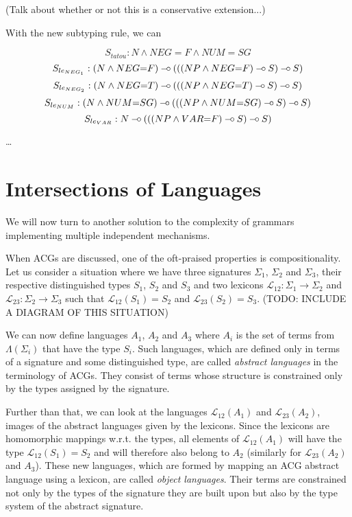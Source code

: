 (Talk about whether or not this is a conservative extension...)

With the new subtyping rule, we can

$$
S_{tatou} : N \land NEG{=}F \land NUM{=}SG
$$
$$
S_{le_{NEG_1}} : (N \land NEG{=}F) \mathbin{{-}\mkern-3.5mu{\circ}} (((NP \land NEG{=}F) \mathbin{{-}\mkern-3.5mu{\circ}} S) \mathbin{{-}\mkern-3.5mu{\circ}} S)
$$
$$
S_{le_{NEG_2}} : (N \land NEG{=}T) \mathbin{{-}\mkern-3.5mu{\circ}} (((NP \land NEG{=}T) \mathbin{{-}\mkern-3.5mu{\circ}} S) \mathbin{{-}\mkern-3.5mu{\circ}} S)
$$
$$
S_{le_{NUM}} : (N \land NUM{=}SG) \mathbin{{-}\mkern-3.5mu{\circ}} (((NP \land NUM{=}SG) \mathbin{{-}\mkern-3.5mu{\circ}} S) \mathbin{{-}\mkern-3.5mu{\circ}} S)
$$
$$
S_{le_{VAR}} : N \mathbin{{-}\mkern-3.5mu{\circ}} (((NP \land VAR{=}F) \mathbin{{-}\mkern-3.5mu{\circ}} S) \mathbin{{-}\mkern-3.5mu{\circ}} S)
$$

\ldots


\section{Intersections of Languages}

We will now turn to another solution to the complexity of grammars
implementing multiple independent mechanisms.

When ACGs are discussed, one of the oft-praised properties is
compositionality. Let us consider a situation where we have three
signatures $\Sigma_1$, $\Sigma_2$ and $\Sigma_3$, their respective
distinguished types $S_1$, $S_2$ and $S_3$ and two lexicons
$\mathcal{L}_{12} : \Sigma_1 \to \Sigma_2$ and $\mathcal{L}_{23} :
\Sigma_2 \to \Sigma_3$ such that $\mathcal{L}_{12}(S_1) = S_2$ and
$\mathcal{L}_{23}(S_2) = S_3$. (TODO: INCLUDE A DIAGRAM OF THIS
SITUATION)

We can now define languages $A_1$, $A_2$ and $A_3$ where $A_i$ is the
set of terms from $\Lambda(\Sigma_i)$ that have the type $S_i$. Such
languages, which are defined only in terms of a signature and some
distinguished type, are called \emph{abstract languages} in the
terminology of ACGs. They consist of terms whose structure is
constrained only by the types assigned by the signature.

Further than that, we can look at the languages $\mathcal{L}_{12}(A_1)$
and $\mathcal{L}_{23}(A_2)$, images of the abstract languages given by
the lexicons. Since the lexicons are homomorphic mappings w.r.t. the
types, all elements of $\mathcal{L}_{12}(A_1)$ will have the type
$\mathcal{L}_{12}(S_1) = S_2$ and will therefore also belong to $A_2$
(similarly for $\mathcal{L}_{23}(A_2)$ and $A_3$). These new languages,
which are formed by mapping an ACG abstract language using a lexicon,
are called \emph{object languages}. Their terms are constrained not only
by the types of the signature they are built upon but also by the type
system of the abstract signature.

